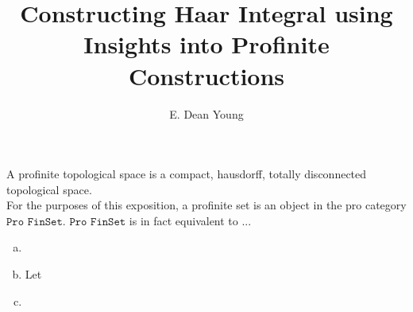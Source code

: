 \documentclass[13pt]{amsart}
\title{Constructing Haar Integral using Insights into Profinite Constructions}
\author{E. Dean Young}
\begin{document}
A profinite topological space is a compact, hausdorff, totally disconnected topological space.\\

For the purposes of this exposition, a profinite set is an object in the pro category $\texttt{Pro FinSet}$. $\texttt{Pro FinSet}$ is in fact equivalent to ... 

\begin{enumerate}[(a)]
\item
\item Let 
\item 
\end{enumerate}
\end{document}
